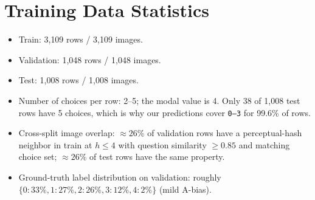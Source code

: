 \documentclass[11pt]{article}
\begin{document}
\section{Training Data Statistics}

\begin{itemize}
  \item Train: 3{,}109 rows / 3{,}109 images.
  \item Validation: 1{,}048 rows / 1{,}048 images.
  \item Test: 1{,}008 rows / 1{,}008 images.
  \item Number of choices per row: 2--5; the modal value is 4. Only 38 of 1{,}008 test rows have 5 choices, which is why our predictions cover \texttt{0--3} for 99.6\% of rows.
  \item Cross-split image overlap: $\approx 26\%$ of validation rows have a perceptual-hash neighbor in train at $h \le 4$ with question similarity $\ge 0.85$ and matching choice set; $\approx 26\%$ of test rows have the same property.
  \item Ground-truth label distribution on validation: roughly $\{0: 33\%, 1: 27\%, 2: 26\%, 3: 12\%, 4: 2\%\}$ (mild A-bias).
\end{itemize}
\end{document}
